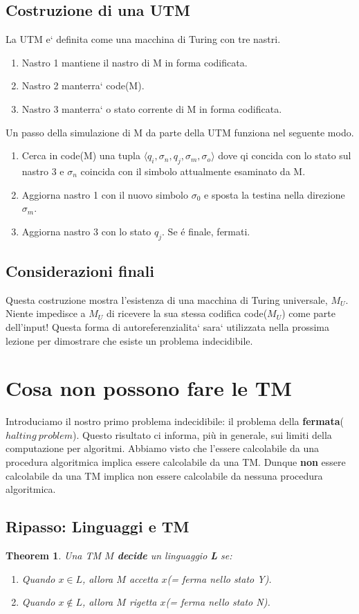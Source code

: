 \documentclass[a4paper, 12pt]{article}
\newtheorem{theorem}{Theorem}[section]
\begin{document}
\subsection{Costruzione di una UTM}
La UTM e` definita come una macchina di Turing con tre nastri. 
\begin{enumerate}
\item Nastro 1 mantiene il nastro di M in forma codificata.
\item Nastro 2 manterra` code(M).
\item Nastro 3 manterra` o stato corrente di M in forma codificata.
\end{enumerate}
Un passo della simulazione di  M da parte della UTM funziona nel seguente modo.
\begin{enumerate}
\item Cerca in code(M) una tupla $⟨ q_i, \sigma_n, q_j, \sigma_m, \sigma_o ⟩$ dove qi concida con lo stato sul nastro 3 e $\sigma_n$ coincida con il simbolo attualmente esaminato da M.
\item Aggiorna nastro 1 con il nuovo simbolo $\sigma_0$ e sposta la testina nella direzione $\sigma_m$.
\item Aggiorna nastro 3 con lo stato $q_j$. Se é finale, fermati.
\end{enumerate}
\subsection{Considerazioni finali}
Questa costruzione mostra l'esistenza di una macchina di Turing universale, $M_U$. Niente impedisce a $M_U$ di ricevere la sua stessa codifica code($M_U$) come parte dell'input! Questa forma di autoreferenzialita` sara` utilizzata nella prossima lezione per dimostrare che esiste un problema indecidibile.

\section{Cosa non possono fare le TM}
Introduciamo il nostro primo problema indecidibile: il problema della \textbf{fermata}($halting\ problem$). Questo risultato ci informa, pi\`u in generale, sui limiti della computazione per algoritmi. Abbiamo visto che l'essere calcolabile da una procedura algoritmica implica essere calcolabile da una TM. Dunque \textbf{non} essere calcolabile da una TM implica non essere calcolabile da nessuna procedura algoritmica.
\subsection{Ripasso: Linguaggi e TM}
\begin{theorem}
Una TM $M$ \textbf{decide} un linguaggio \textbf{L} se:
\begin{enumerate}
\item Quando $x \in L$, allora $M$ accetta $x$(= ferma nello stato Y).
\item Quando $x \notin L$, allora $M$ rigetta $x$(= ferma nello stato N).
\end{enumerate}
\end{theorem}
\end{document}
